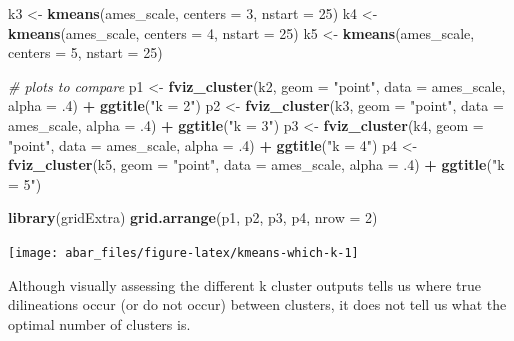 \documentclass[]{book}
\newenvironment{Shaded}{\begin{snugshade}}{\end{snugshade}}
\newcommand{\CommentTok}[1]{\textcolor[rgb]{0.56,0.35,0.01}{\textit{#1}}}
\newcommand{\DataTypeTok}[1]{\textcolor[rgb]{0.13,0.29,0.53}{#1}}
\newcommand{\DecValTok}[1]{\textcolor[rgb]{0.00,0.00,0.81}{#1}}
\newcommand{\FloatTok}[1]{\textcolor[rgb]{0.00,0.00,0.81}{#1}}
\newcommand{\KeywordTok}[1]{\textcolor[rgb]{0.13,0.29,0.53}{\textbf{#1}}}
\newcommand{\NormalTok}[1]{#1}
\newcommand{\OperatorTok}[1]{\textcolor[rgb]{0.81,0.36,0.00}{\textbf{#1}}}
\newcommand{\StringTok}[1]{\textcolor[rgb]{0.31,0.60,0.02}{#1}}
\theoremstyle{definition}
\theoremstyle{definition}
\theoremstyle{definition}
\theoremstyle{remark}
\begin{document}
\begin{Shaded}
\begin{Highlighting}[]
\NormalTok{k3 <-}\StringTok{ }\KeywordTok{kmeans}\NormalTok{(ames_scale, }\DataTypeTok{centers =} \DecValTok{3}\NormalTok{, }\DataTypeTok{nstart =} \DecValTok{25}\NormalTok{)}
\NormalTok{k4 <-}\StringTok{ }\KeywordTok{kmeans}\NormalTok{(ames_scale, }\DataTypeTok{centers =} \DecValTok{4}\NormalTok{, }\DataTypeTok{nstart =} \DecValTok{25}\NormalTok{)}
\NormalTok{k5 <-}\StringTok{ }\KeywordTok{kmeans}\NormalTok{(ames_scale, }\DataTypeTok{centers =} \DecValTok{5}\NormalTok{, }\DataTypeTok{nstart =} \DecValTok{25}\NormalTok{)}

\CommentTok{# plots to compare}
\NormalTok{p1 <-}\StringTok{ }\KeywordTok{fviz_cluster}\NormalTok{(k2, }\DataTypeTok{geom =} \StringTok{"point"}\NormalTok{, }\DataTypeTok{data =}\NormalTok{ ames_scale, }\DataTypeTok{alpha =} \FloatTok{.4}\NormalTok{) }\OperatorTok{+}\StringTok{ }\KeywordTok{ggtitle}\NormalTok{(}\StringTok{"k = 2"}\NormalTok{)}
\NormalTok{p2 <-}\StringTok{ }\KeywordTok{fviz_cluster}\NormalTok{(k3, }\DataTypeTok{geom =} \StringTok{"point"}\NormalTok{,  }\DataTypeTok{data =}\NormalTok{ ames_scale, }\DataTypeTok{alpha =} \FloatTok{.4}\NormalTok{) }\OperatorTok{+}\StringTok{ }\KeywordTok{ggtitle}\NormalTok{(}\StringTok{"k = 3"}\NormalTok{)}
\NormalTok{p3 <-}\StringTok{ }\KeywordTok{fviz_cluster}\NormalTok{(k4, }\DataTypeTok{geom =} \StringTok{"point"}\NormalTok{,  }\DataTypeTok{data =}\NormalTok{ ames_scale, }\DataTypeTok{alpha =} \FloatTok{.4}\NormalTok{) }\OperatorTok{+}\StringTok{ }\KeywordTok{ggtitle}\NormalTok{(}\StringTok{"k = 4"}\NormalTok{)}
\NormalTok{p4 <-}\StringTok{ }\KeywordTok{fviz_cluster}\NormalTok{(k5, }\DataTypeTok{geom =} \StringTok{"point"}\NormalTok{,  }\DataTypeTok{data =}\NormalTok{ ames_scale, }\DataTypeTok{alpha =} \FloatTok{.4}\NormalTok{) }\OperatorTok{+}\StringTok{ }\KeywordTok{ggtitle}\NormalTok{(}\StringTok{"k = 5"}\NormalTok{)}

\KeywordTok{library}\NormalTok{(gridExtra)}
\KeywordTok{grid.arrange}\NormalTok{(p1, p2, p3, p4, }\DataTypeTok{nrow =} \DecValTok{2}\NormalTok{)}
\end{Highlighting}
\end{Shaded}

\begin{center}\texttt{[image: abar\_files/figure-latex/kmeans-which-k-1]} \end{center}

Although visually assessing the different k cluster outputs tells us
where true dilineations occur (or do not occur) between clusters, it
does not tell us what the optimal number of clusters is.
\end{document}
